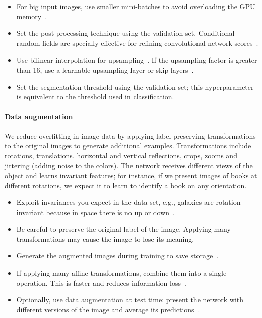 \begin{itemize}

	\item For big input images, use smaller mini-batches to avoid overloading the GPU memory~\cite{Karpathy2015}.

	\item Set the post-processing technique using the validation set. Conditional random fields are specially effective for refining convolutional network scores~\cite{Chen2015}.

	\item Use bilinear interpolation for upsampling~\cite{Chen2015}. If the upsampling factor is greater than 16, use a learnable upsampling layer or skip layers~\cite{Long2015}.

	\item Set the segmentation threshold using the validation set; this hyperparameter is equivalent to the threshold used in classification.

\end{itemize}

\paragraph{Data augmentation} We reduce overfitting in image data by applying label-preserving transformations to the original images to generate additional examples. Transformations include rotations, translations, horizontal and vertical reflections, crops, zooms and jittering (adding noise to the colors).  The network receives different views of the object and learns invariant features; for instance, if we present images of books at different rotations, we expect it to learn to identify a book on any orientation.

\begin{itemize}
	\item Exploit invariances you expect in the data set, e.g., galaxies are rotation-invariant because in space there is no up or down~\cite{Dieleman2015}.%

	\item Be careful to preserve the original label of the image. Applying many transformations may cause the image to lose its meaning. 

	\item Generate the augmented images during training to save storage~\cite{Krizhevsky2012}.

	\item If applying many affine transformations, combine them into a single operation. This is faster and reduces information loss~\cite{Dieleman2015}.

	\item Optionally, use data augmentation at test time: present the network with different versions of the image and average its predictions~\cite{Krizhevsky2012}.
\end{itemize}

